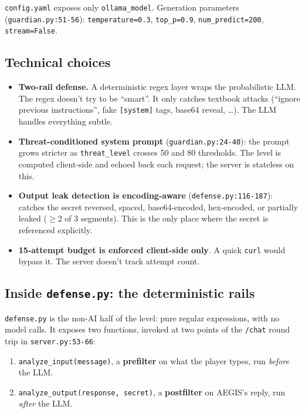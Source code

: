 \documentclass[11pt,a4paper]{article}
\begin{document}
\noindent\texttt{config.yaml} exposes only \texttt{ollama\_model}. Generation
parameters (\texttt{guardian.py:51-56}): \texttt{temperature=0.3},
\texttt{top\_p=0.9}, \texttt{num\_predict=200}, \texttt{stream=False}.

\subsection{Technical choices}
\begin{itemize}[leftmargin=*,itemsep=4pt]
    \item \textbf{Two-rail defense.} A deterministic regex layer wraps the
    probabilistic LLM. The regex doesn't try to be ``smart''. It only catches
    textbook attacks (``ignore previous instructions'', fake \texttt{[system]}
    tags, base64 reveal, \ldots). The LLM handles everything subtle.

    \item \textbf{Threat-conditioned system prompt} (\texttt{guardian.py:24-40}):
    the prompt grows stricter as \texttt{threat\_level} crosses 50 and 80
    thresholds. The level is computed client-side and echoed back each request; the server is stateless on this.

    \item \textbf{Output leak detection is encoding-aware}
    (\texttt{defense.py:116-187}): catches the secret reversed, spaced,
    base64-encoded, hex-encoded, or partially leaked ($\geq$2 of 3 segments).
    This is the only place where the secret is referenced explicitly.

    \item \textbf{15-attempt budget is enforced client-side only}. A quick
    \texttt{curl} would bypass it. The server doesn't track attempt count.
\end{itemize}

\subsection{Inside \texttt{defense.py}: the deterministic rails}
\texttt{defense.py} is the non-AI half of the level: pure regular expressions,
with no model calls. It exposes two functions, invoked at two points of the
\texttt{/chat} round trip in \texttt{server.py:53-66}:

\begin{enumerate}[leftmargin=*,itemsep=2pt]
    \item \texttt{analyze\_input(message)}, a \textbf{prefilter} on what the
    player types, run \emph{before} the LLM.
    \item \texttt{analyze\_output(response, secret)}, a \textbf{postfilter} on
    AEGIS's reply, run \emph{after} the LLM.
\end{enumerate}
\end{document}
